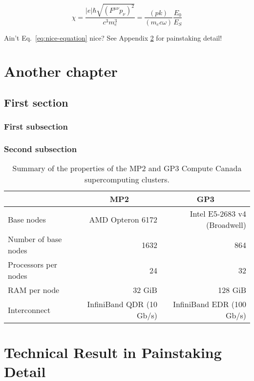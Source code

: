 \documentclass[11pt,SymmetricalJury,PhD]{inrsthesis}  %
\begin{document}
\lipsum[3]

  \begin{equation}
    \label{eq:nice-equation}
    \chi = \frac{|e|\hbar\sqrt{\left(F^{\mu\nu}p_\nu\right)^2}}{c^3m_e^3} = \frac{(pk)}{(m_e c\omega)}\frac{E_0}{E_S}
  \end{equation}

Ain't Eq.~\eqref{eq:nice-equation} nice? See Appendix \ref{app.technical} for
painstaking detail!

\chapter{Another chapter}
\label{chapter:methods}

\section{First section}

\subsection{First subsection}

\subsection{Second subsection}


\begin{table}
  \centering
  \begin{tabular}{lrr}
  \toprule
                       & \multicolumn{1}{c}{MP2}   & \multicolumn{1}{c}{GP3}      \\
  \midrule
  Base nodes           & AMD Opteron 6172          & Intel E5-2683 v4 (Broadwell) \\
  Number of base nodes & 1632                      & 864                          \\
  Processors per nodes & 24                        & 32                           \\
  RAM per node         & 32 GiB                    & 128 GiB                      \\
  Interconnect         & InfiniBand QDR (10 Gb/s)  & InfiniBand EDR (100 Gb/s)    \\
  \bottomrule
  \end{tabular}
  \caption{Summary of the properties of the MP2 and GP3 Compute Canada supercomputing clusters.}
  \label{tab:summary-of-cc-clusters}
\end{table}


\appendix
{}
\renewcommand{\thechapter}{\Alph{chapter}}
\renewcommand{\thesection}{\Alph{chapter}.\arabic{section}}

\chapter{Technical Result in Painstaking Detail}
\label{app.technical}

\backmatter

\nocite{*}


\end{document}
